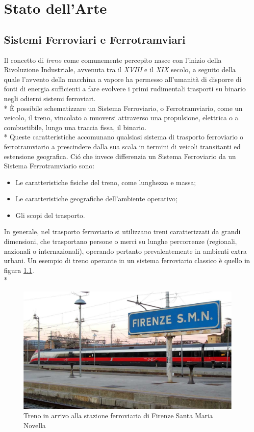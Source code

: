 \chapter{Stato dell'Arte}
\section{Sistemi Ferroviari e Ferrotramviari}
Il concetto di \emph{treno} come comunemente percepito nasce con l'inizio della Rivoluzione Industriale, avvenuta tra il \emph{XVIII} e il \emph{XIX} secolo, a seguito della quale l'avvento della macchina a vapore ha permesso all'umanit\`a di disporre di fonti di energia sufficienti a fare evolvere i primi rudimentali trasporti su binario negli odierni sistemi ferroviari.\\*
\noindent\`E possibile schematizzare un Sistema Ferroviario, o Ferrotramviario, come un veicolo, il treno, vincolato a muoversi attraverso una propulsione, elettrica o a combustibile, lungo una traccia fissa, il binario.\\*
Queste caratteristiche accomunano qualsiasi sistema di trasporto ferroviario o ferrotramviario a prescindere dalla sua scala in termini di veicoli transitanti ed estensione geografica. Ci\'o che invece differenzia un Sistema Ferroviario da un Sistema Ferrotramviario sono:
\begin{itemize}
	\item Le caratteristiche fisiche del treno, come lunghezza e massa;
	\item Le caratteristiche geografiche dell'ambiente operativo;
	\item Gli scopi del trasporto.
\end{itemize}
In generale, nel trasporto ferroviario si utilizzano treni caratterizzati da grandi dimensioni, che trasportano persone o merci su lunghe percorrenze (regionali, nazionali o internazionali), operando pertanto prevalentemente in ambienti extra urbani. Un esempio di treno operante in un sistema ferroviario classico \`e quello in figura \ref{fig:frecciarossa}.\\*
\begin{figure}[h]
	\centering
	\includegraphics[width=0.7\linewidth]{img/frecciarossa}
	\caption{Treno in arrivo alla stazione ferroviaria di Firenze Santa Maria Novella}
	\label{fig:frecciarossa}
\end{figure}

